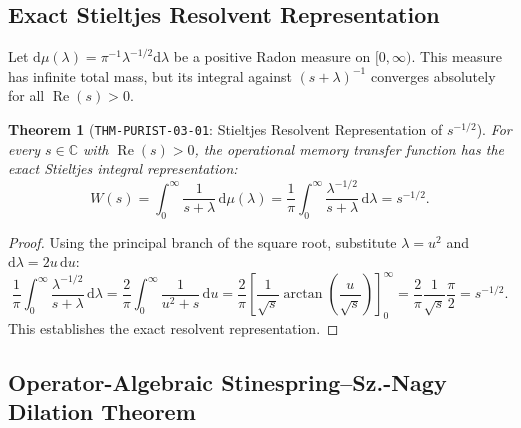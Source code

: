\documentclass[11pt,a4paper,reqno]{article}
\theoremstyle{plain}
\newtheorem{theorem}{Theorem}[section]
\theoremstyle{definition}
\theoremstyle{remark}
\numberwithin{equation}{section}
\providecommand{\diff}{\mathrm{d}}
\begin{document}
\subsection{Exact Stieltjes Resolvent Representation}
Let $\diff\mu(\lambda) = \pi^{-1}\lambda^{-1/2}\diff\lambda$ be a positive Radon measure on $[0,\infty)$. This measure has infinite total mass, but its integral against $(s+\lambda)^{-1}$ converges absolutely for all $\operatorname{Re}(s)>0$.

\begin{theorem}[\texttt{THM-PURIST-03-01}: Stieltjes Resolvent Representation of $s^{-1/2}$]
\label{thm:stieltjes_resolvent}
For every $s \in \mathbb{C}$ with $\operatorname{Re}(s)>0$, the operational memory transfer function has the exact Stieltjes integral representation:
\begin{equation}
  W(s) = \int_0^\infty \frac{1}{s+\lambda}\,\diff\mu(\lambda) = \frac{1}{\pi} \int_0^\infty \frac{\lambda^{-1/2}}{s + \lambda}\,\diff\lambda = s^{-1/2}.
  \label{eq:stieltjes_resolvent}
\end{equation}
\end{theorem}

\begin{proof}
Using the principal branch of the square root, substitute $\lambda = u^2$ and $\diff\lambda = 2u\,\diff u$:
\begin{equation}
  \frac{1}{\pi} \int_0^\infty \frac{\lambda^{-1/2}}{s + \lambda}\,\diff\lambda = \frac{2}{\pi} \int_0^\infty \frac{1}{u^2 + s}\,\diff u = \frac{2}{\pi} \left[ \frac{1}{\sqrt{s}} \arctan\left(\frac{u}{\sqrt{s}}\right) \right]_0^\infty = \frac{2}{\pi} \frac{1}{\sqrt{s}} \frac{\pi}{2} = s^{-1/2}.
\end{equation}
This establishes the exact resolvent representation.
\end{proof}

\subsection{Operator-Algebraic Stinespring--Sz.-Nagy Dilation Theorem}
\label{subsec:stinespring_dilation_thm}
\end{document}
